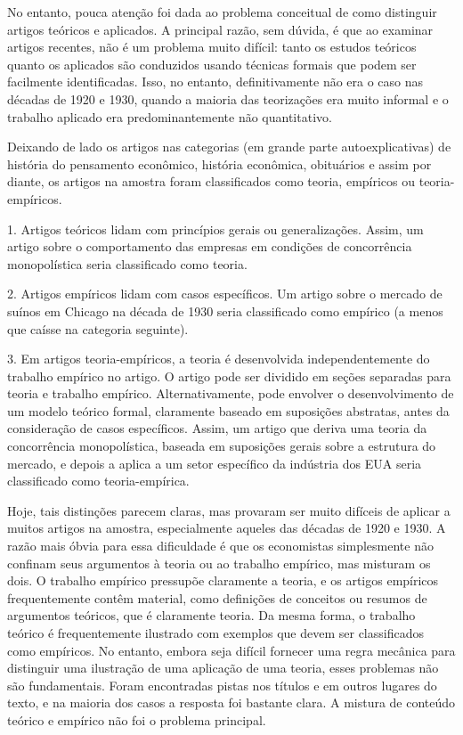 \documentclass[12pt]{article}
\begin{document}
No entanto, pouca atenção foi dada ao problema conceitual de como distinguir artigos teóricos e aplicados. A principal razão, sem dúvida, é que ao examinar artigos recentes, não é um problema muito difícil: tanto os estudos teóricos quanto os aplicados são conduzidos usando técnicas formais que podem ser facilmente identificadas. Isso, no entanto, definitivamente não era o caso nas décadas de 1920 e 1930, quando a maioria das teorizações era muito informal e o trabalho aplicado era predominantemente não quantitativo.

Deixando de lado os artigos nas categorias (em grande parte autoexplicativas) de história do pensamento econômico, história econômica, obituários e assim por diante, os artigos na amostra foram classificados como teoria, empíricos ou teoria-empíricos.

1. Artigos teóricos lidam com princípios gerais ou generalizações. Assim, um artigo sobre o comportamento das empresas em condições de concorrência monopolística seria classificado como teoria.

2. Artigos empíricos lidam com casos específicos. Um artigo sobre o mercado de suínos em Chicago na década de 1930 seria classificado como empírico (a menos que caísse na categoria seguinte).

3. Em artigos teoria-empíricos, a teoria é desenvolvida independentemente do trabalho empírico no artigo. O artigo pode ser dividido em seções separadas para teoria e trabalho empírico. Alternativamente, pode envolver o desenvolvimento de um modelo teórico formal, claramente baseado em suposições abstratas, antes da consideração de casos específicos. Assim, um artigo que deriva uma teoria da concorrência monopolística, baseada em suposições gerais sobre a estrutura do mercado, e depois a aplica a um setor específico da indústria dos EUA seria classificado como teoria-empírica.

Hoje, tais distinções parecem claras, mas provaram ser muito difíceis de aplicar a muitos artigos na amostra, especialmente aqueles das décadas de 1920 e 1930. A razão mais óbvia para essa dificuldade é que os economistas simplesmente não confinam seus argumentos à teoria ou ao trabalho empírico, mas misturam os dois. O trabalho empírico pressupõe claramente a teoria, e os artigos empíricos frequentemente contêm material, como definições de conceitos ou resumos de argumentos teóricos, que é claramente teoria. Da mesma forma, o trabalho teórico é frequentemente ilustrado com exemplos que devem ser classificados como empíricos. No entanto, embora seja difícil fornecer uma regra mecânica para distinguir uma ilustração de uma aplicação de uma teoria, esses problemas não são fundamentais. Foram encontradas pistas nos títulos e em outros lugares do texto, e na maioria dos casos a resposta foi bastante clara. A mistura de conteúdo teórico e empírico não foi o problema principal.
\end{document}
